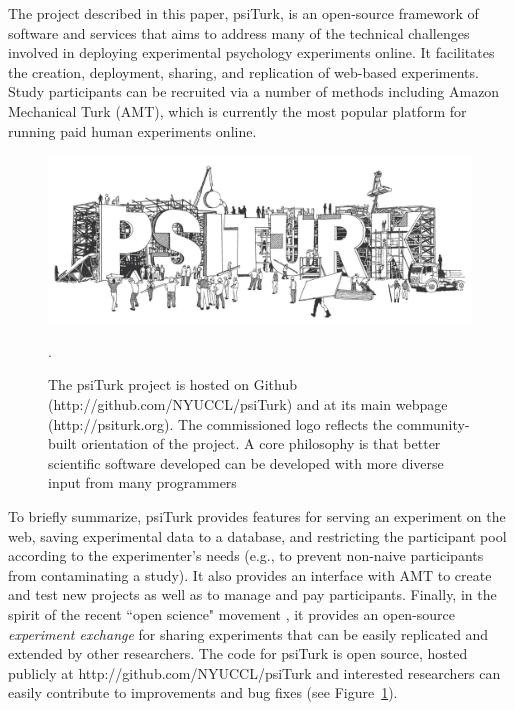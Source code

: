 \documentclass[twocolumn]{svjour3}          %
\begin{document}
The project described in this paper, \textsf{psiTurk}, is an open-source framework of 
software and services that aims to address many of the technical challenges
involved in deploying experimental psychology experiments online.
It facilitates the creation, deployment, sharing, and replication of web-based experiments.
Study participants can be recruited via a number of methods including Amazon 
Mechanical Turk (AMT), which is currently the most popular platform for running 
paid human experiments online.

\begin{figure}[tp]
\centering
\includegraphics[scale=.30]{figures/psiturk_logo.jpg}
\caption{The \textsf{psiTurk} project is hosted on Github 
(http://github.com/NYUCCL/psiTurk) and at its main webpage (http://psiturk.org). 
The commissioned logo reflects the community-built orientation of the project.  A 
core philosophy is that better scientific software developed can be developed 
with more diverse input from many programmers~\citep{Raymond:1999zt}}.
\label{fig:logo}
\end{figure}

To briefly summarize, \textsf{psiTurk} provides features for serving an 
experiment on the web, saving experimental data to a database, and restricting the 
participant pool according to the experimenter's needs (e.g., to prevent non-naive 
participants from contaminating a study). It also provides an interface with AMT to 
create and test new projects as well as to manage and pay participants. Finally, in 
the spirit of the recent ``open science" movement \citep{Collaboration:2012vf},
it provides  an open-source \emph{experiment exchange} for sharing experiments 
that can be easily replicated and extended by other researchers.  The code for 
\textsf{psiTurk} is open source, hosted publicly at
\textsf{http://github.com/NYUCCL/psiTurk} and interested researchers can easily 
contribute to improvements and bug fixes (see Figure~\ref{fig:logo}).
\end{document}
